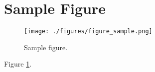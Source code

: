
\section{Sample Figure}

\begin{figure}[!htb]
\texttt{[image: ./figures/figure\_sample.png]}
\caption{Sample figure.}
\label{figure_sample}
\end{figure}

Figure \ref{figure_sample}.
